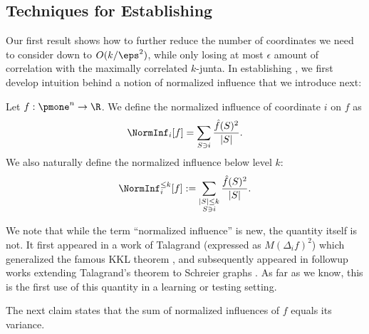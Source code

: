 \subsection{Techniques for Establishing }
\label{subsection:improved-dmn-techniques}

Our first result shows how to further reduce the number of coordinates we need to consider down to $O(k/\eps^2)$, while only losing at most $\epsilon$ amount of correlation with the maximally correlated $k$-junta.
In establishing , we first develop intuition behind a notion of normalized influence that we introduce next:

\begin{definition}
\label{definition:normalized-influence}
Let $f: \pmone^n \to \R$.
We define the normalized influence of coordinate $i$ on $f$ as
$$\NormInf_{i}[f] = \sum_{ S \ni i}\frac{\hat{f}(S)^2}{|S|}.$$
We also naturally define the normalized influence below level $k$: 
$$\NormInf_i^{\leq k}[f]:= \sum_{\substack{|S| \leq k \\ S \ni i}}\frac{\hat{f}(S)^2}{|S|}.$$
\end{definition}

We note that while the term ``normalized influence'' is new, the quantity itself is not. It first appeared in a work of Talagrand \cite{Talagrand-zero-one} (expressed as $M(\Delta_i f)^2$) which generalized the famous KKL theorem \cite{DBLP:conf/focs/KahnKL88, DBLP:journals/eccc/KelmanKKMS20}, and subsequently appeared in followup works extending Talagrand's theorem to Schreier graphs \cite{OK-schreier}. As far as we know, this is the first use of this quantity in a learning or testing setting.


The next claim states that the sum of normalized influences of $f$ equals its variance.


